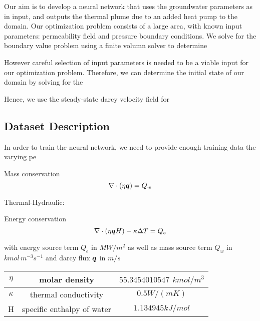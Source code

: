 \documentclass{article} %
\begin{document}
Our aim is to develop a neural network that uses the groundwater parameters as in input, and outputs the thermal plume due to an added heat pump to the domain. 
Our optimization problem consists of a large area, with known input parameters: permeability field and pressure boundary conditions. 
We solve for the boundary value problem using a finite volumn solver to determine 

However careful selection of input parameters is needed to be a viable input for our optimization problem.  Therefore, we can determine the initial state of our domain by solving for the 

Hence, we use the steady-state darcy velocity field for  



\subsection*{Dataset Description}

In order to train the neural network, we need to provide enough training data the varying pe






Mass conservation
\begin{equation}
   \label{eq:mass}
   \nabla \cdot \left(\eta {\bm{q}} \right) = Q_w
\end{equation}

Thermal-Hydraulic:

Energy conservation
\begin{equation}
   \label{eq:energy}
   \nabla \cdot \left(\eta {\bm{q}} H\right) - \kappa \Delta T = Q_e
\end{equation}

with energy source term $Q_e$ in $MW/m^2$ as well as mass source term $Q_w$ in $kmol\, m^{-3} s^{-1}$ and darcy flux ${\bm{q}}$ in $m/s$

\begin{tabular}{| c | c | c |}
   \hline
   $\eta$   & molar density        & $55.3454010547$ $kmol/m^3$ \\
   \hline
   $\kappa$ & thermal conductivity & $0.5 W/(mK)$                   \\
   \hline
   H        & specific enthalpy of water             & $1.134945 kJ/mol$                  \\
   \hline
\end{tabular}
\end{document}
